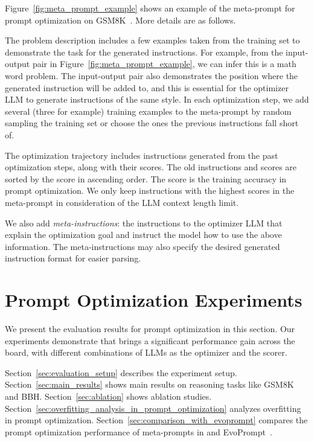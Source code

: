 Figure~\ref{fig:meta_prompt_example} shows an example of the meta-prompt for prompt optimization on GSM8K~\citep{cobbe2021training}.
More details are as follows.

 The problem description includes a few examples taken from the training set to demonstrate the task for the generated instructions. 
For example, from the input-output pair in Figure~\ref{fig:meta_prompt_example}, we can infer this is a math word problem. 
The input-output pair also demonstrates the position where the generated instruction will be added to, and this is essential for the optimizer LLM to generate instructions of the same style.
In each optimization step, we add several (three for example) training examples to the meta-prompt by random sampling the training set or choose the ones the previous instructions fall short of.

The optimization trajectory includes instructions generated from the past optimization steps, along with their scores.
The old instructions and scores are sorted by the score in ascending order.
The score is the training accuracy in prompt optimization. 
We only keep instructions with the highest scores in the meta-prompt in consideration of the LLM context length limit.

We also add \emph{meta-instructions}: the instructions to the optimizer LLM that explain the optimization goal and instruct the model how to use the above information.
The meta-instructions may also specify the desired generated instruction format for easier parsing.\section{Prompt Optimization Experiments}
\label{sec:exp}

We present the evaluation results for prompt optimization in this section. Our experiments demonstrate that \name{} brings a significant performance gain across the board, with different combinations of LLMs as the optimizer and the scorer.

Section~\ref{sec:evaluation_setup} describes the experiment setup.
Section~\ref{sec:main_results} shows main results on reasoning tasks like GSM8K and BBH.
Section~\ref{sec:ablation} shows ablation studies. 
Section~\ref{sec:overfitting_analysis_in_prompt_optimization} analyzes overfitting in prompt optimization.
Section~\ref{sec:comparison_with_evoprompt} compares the prompt optimization performance of meta-prompts in \name{} and EvoPrompt~\citep{guo2023connecting}.

